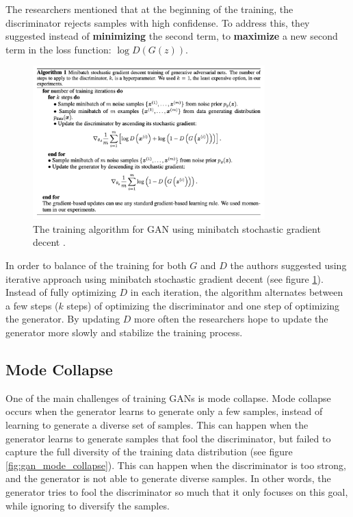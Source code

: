 The researchers mentioned that at the beginning of the training, the discriminator rejects samples with high confidense. To address this, they suggested instead of \textbf{minimizing} the second term, to \textbf{maximize} a new second term in the loss function: $\log D(G(z))$.


\begin{figure}
    \centering
    \includegraphics[width=0.8\textwidth]{images/gan/gan_training.png}
    \caption{The training algorithm for GAN using minibatch stochastic gradient decent \cite{gan}.}
    \label{fig:gan_training}
\end{figure}

In order to balance of the training for both $G$ and $D$ the authors suggested using iterative approach using minibatch stochastic gradient decent (see figure \ref{fig:gan_training}). Instead of fully optimizing $D$ in each iteration, the algorithm alternates between a few steps ($k$ steps) of optimizing the discriminator and one step of optimizing the generator. By updating $D$ more often the researchers hope to update the generator more slowly and stabilize the training process.



\subsection{Mode Collapse}
\label{gan_mode_collapse}

One of the main challenges of training GANs is mode collapse. Mode collapse occurs when the generator learns to generate only a few samples, instead of learning to generate a diverse set of samples. This can happen when the generator learns to generate samples that fool the discriminator, but failed to capture the full diversity of the training data distribution (see figure \ref{fig:gan_mode_collapse}). This can happen when the discriminator is too strong, and the generator is not able to generate diverse samples. In other words, the generator tries to fool the discriminator so much that it only focuses on this goal, while ignoring to diversify the samples.

